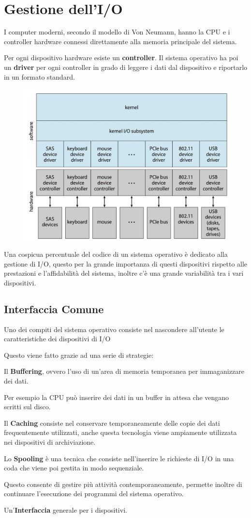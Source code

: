 \section{Gestione dell'I/O}
I computer moderni, secondo il modello di Von Neumann, hanno la CPU e i controller hardware connessi direttamente alla memoria principale del sistema.

Per ogni dispositivo hardware esiste un \textbf{controller}. Il sistema operativo ha poi un \textbf{driver} per ogni controller in grado di leggere i dati dal dispositivo e riportarlo in un formato standard.
\begin{figure}[H]
    \centering
    \includegraphics[width=0.45\linewidth]{assets/controller-driver.jpg}
\end{figure}

\begin{note}
    Una cospicua percentuale del codice di un sistema operativo è dedicato alla gestione di I/O, questo per la grande importanza di questi dispositivi rispetto alle prestazioni e l'affidabilità del sistema, inoltre c'è una grande variabilità tra i  vari dispositivi.
\end{note}

\subsection{Interfaccia Comune}
Uno dei compiti del sistema operativo consiste nel nascondere all'utente le caratteristiche dei dispositivi di I/O

Questo viene fatto grazie ad una serie di strategie:
\begin{sitemize}
    \item Il \textbf{Buffering}, ovvero l'uso di un'area di memoria temporanea per immaganizzare dei dati.

    Per esempio la CPU può inserire dei dati in un buffer in attesa che vengano scritti sul disco.
    \item Il \textbf{Caching} consiste nel conservare temporaneamente delle copie dei dati frequentemente utilizzati, anche questa tecnologia viene ampiamente utilizzata nei dispositivi di archiviazione.
    \item Lo \textbf{Spooling} è una tecnica che consiste nell'inserire le richieste di I/O in una coda che viene poi gestita in modo sequenziale.

    Questo consente di gestire più attività contemporaneamente, permette inoltre di continuare l'esecuzione dei programmi del sistema operativo.

    \item Un'\textbf{Interfaccia} generale per i dispositivi.
\end{sitemize}

